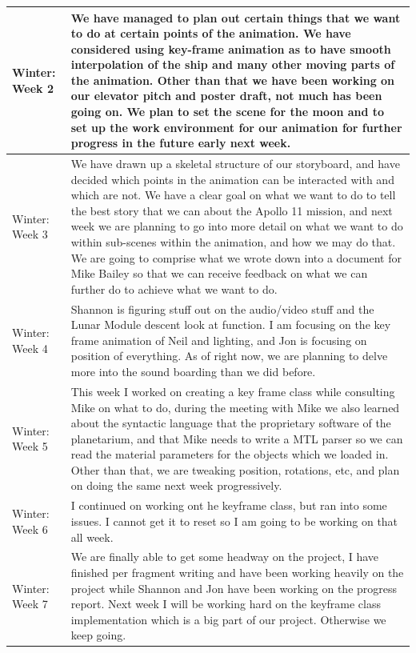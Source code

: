 \documentclass[onecolumn, draftclsnofoot,10pt, compsoc]{IEEEtran}
\begin{document}
\begin{longtable} {|p{1.5cm}|p{13.5cm}|}
Winter: Week 2 &
We have managed to plan out certain things that we want to do at certain points of the animation. We have considered using key-frame animation as to have smooth interpolation of the ship and many other moving parts of the animation. Other than that we have been working on our elevator pitch and poster draft, not much has been going on. We plan to set the scene for the moon and to set up the work environment for our animation for further progress in the future early next week. \\ \hline

Winter: Week 3 &
We have drawn up a skeletal structure of our storyboard, and have decided which points in the animation can be interacted with and which are not. We have a clear goal on what we want to do to tell the best story that we can about the Apollo 11 mission, and next week we are planning to go into more detail on what we want to do within sub-scenes within the animation, and how we may do that. We are going to comprise what we wrote down into a document for Mike Bailey so that we can receive feedback on what we can further do to achieve what we want to do. \\ \hline

Winter: Week 4 &
Shannon is figuring stuff out on the audio/video stuff and the Lunar Module descent look at function. I am focusing on the key frame animation of Neil and lighting, and Jon is focusing on position of everything. As of right now, we are planning to delve more into the sound boarding than we did before. \\ \hline

Winter: Week 5 &
This week I worked on creating a key frame class while consulting Mike on what to do, during the meeting with Mike we also learned about the syntactic language that the proprietary software of the planetarium, and that Mike needs to write a MTL parser so we can read the material parameters for the objects which we loaded in. Other than that, we are tweaking position, rotations, etc, and plan on doing the same next week progressively. \\ \hline

Winter: Week 6 &
I continued on working ont he keyframe class, but ran into some issues. I cannot get it to reset so I am going to be working on that all week. \\ \hline

Winter: Week 7 &
We are finally able to get some headway on the project, I have finished per fragment writing and have been working heavily on the project while Shannon and Jon have been working on the progress report. Next week I will be working hard on the keyframe class implementation which is a big part of our project. Otherwise we keep going. \\ \hline


\end{longtable}
\end{document}
